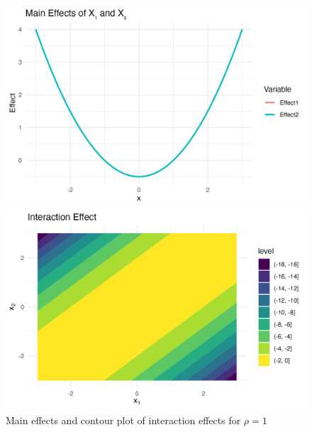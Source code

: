 \begin{figure}[htpb]
    \centering
    \begin{minipage}[t]{0.49\textwidth}
        \centering
        \includegraphics[width=\textwidth]{images/interaction_a1p00_a2p00_a11p00_a22p00_a12p10_rhop10_main.png}
    \end{minipage}%
    \hfill
    \begin{minipage}[t]{0.49\textwidth}
        \centering
        \includegraphics[width=\textwidth]{images/interaction_a1p00_a2p00_a11p00_a22p00_a12p10_rhop10_interaction.png}
    \end{minipage}
    \caption{Main effects and contour plot of interaction effects for $\rho = 1$}
    \label{fig:interaction_rho_1}
\end{figure}

